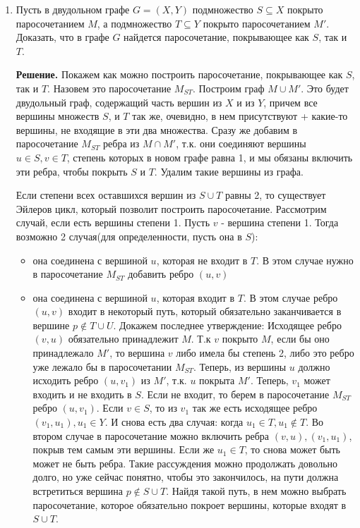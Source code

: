 \documentclass[fleqn]{article}
\begin{document}
	\begin{enumerate}
	\item Пусть в двудольном графе $G = (X, Y)$ подмножество $S \subseteq X$ покрыто паросочетанием $M$, а подмножество $T \subseteq Y$ покрыто паросочетанием $M'$. Доказать, что в графе $G$ найдется паросочетание, покрывающее как $S$, так и $T$.
	
	\textbf{Решение.} Покажем как можно построить паросочетание, покрывающее как $S$, так и $T$. Назовем это паросочетание $M_{ST}$. Построим граф $M \cup M'$. Это будет двудольный граф, содержащий часть вершин из $X$ и из $Y$, причем все вершины множеств $S$, и $T$ так же, очевидно, в нем присутствуют + какие-то вершины, не входящие в эти два множества. Сразу же добавим в паросочетание $M_{ST}$ ребра из $M\cap M'$, т.к. они соединяют вершины $u \in S, v \in T$, степень которых в новом графе равна 1, и мы обязаны включить эти ребра, чтобы покрыть $S$ и $T$. Удалим такие вершины из графа. 
	 
	 Если степени всех оставшихся вершин из $S \cup T$ равны 2, то существует Эйлеров цикл, который позволит построить паросочетание. Рассмотрим случай, если есть вершины степени 1. Пусть $v$ - вершина степени 1. Тогда возможно 2 случая(для определенности, пусть она в $S$): 
	 \begin{itemize}
	 	\item она соединена с вершиной $u$, которая не входит в $T$. В этом случае нужно в паросочетание $M_{ST}$ добавить ребро $(u,v)$
	 	\item она соединена с вершиной $u$, которая входит в $T$. В этом случае ребро $(u,v)$ входит в некоторый путь, который обязательно заканчивается в вершине $p \notin T\cup U$. Докажем последнее утверждение: Исходящее ребро $(v,u)$ обязательно принадлежит $M$. Т.к $v$ покрыто $M$, если бы оно принадлежало $M'$, то вершина $v$ либо имела бы степень 2, либо это ребро уже лежало бы в паросочетании $M_{ST}$. Теперь, из вершины $u$ должно исходить ребро $(u, v_1)$ из $M'$, т.к. $u$ покрыта $M'$. Теперь, $v_1$ может входить и не входить в $S$. Если не входит, то берем в паросочетание $M_{ST}$ ребро $(u,v_1)$. Если $v \in S$, то из $v_1$ так же есть исходящее ребро $(v_1, u_1), u_1 \in Y$. И снова есть два случая: когда $u_1 \in T, u_1 \notin T$. Во втором случае в паросочетание можно включить ребра $(v,u), (v_1, u_1)$, покрыв тем самым эти вершины. Если же $u_1 \in T$, то снова может быть может не быть ребра. Такие рассуждения можно продолжать довольно долго, но уже сейчас понятно, чтобы это закончилось, на пути должна встретиться вершина $p\notin S\cup T$. Найдя такой путь, в нем можно выбрать паросочетание, которое обязательно покроет вершины, которые входят в $S\cup T$.
	 	

\end{itemize}
\end{enumerate}
\end{document}
